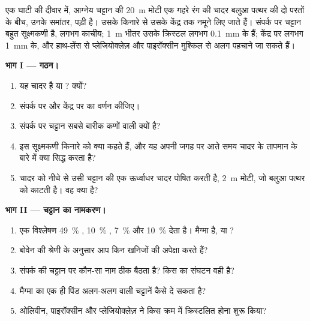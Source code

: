 \begin{problem}
\label{pb:g11:igneous-rocks:1}
एक घाटी की दीवार में, आग्नेय चट्टान की \qty{20}{m} मोटी एक गहरे रंग की चादर
बलुआ पत्थर की दो परतों के बीच, उनके समांतर, पड़ी है। उसके किनारे से उसके
केंद्र तक नमूने लिए जाते हैं। संपर्क पर चट्टान बहुत सूक्ष्मकणी है, लगभग
काचीय; \qty{1}{m} भीतर उसके क्रिस्टल लगभग \qty{0.1}{mm} के हैं;
केंद्र पर लगभग \qty{1}{mm} के, और हाथ-लेंस से प्लेजियोक्लेज़ और पाइरॉक्सीन मुश्किल से
अलग पहचाने जा सकते हैं।

\medskip
\noindent\textbf{भाग I --- गठन।}
\begin{enumerate}
  \item यह चादर  है या ? क्यों?
  \item संपर्क पर और केंद्र पर  का वर्णन कीजिए।
  \item संपर्क पर चट्टान सबसे बारीक कणों वाली क्यों है?
  \item इस सूक्ष्मकणी किनारे को क्या कहते हैं, और यह अपनी जगह पर आते समय
        चादर के तापमान के बारे में क्या सिद्ध करता है?
  \item चादर को नीचे से उसी चट्टान की एक ऊर्ध्वाधर चादर पोषित करती है,
        \qty{2}{m} मोटी, जो बलुआ पत्थर को काटती है। वह क्या है?
\end{enumerate}

\medskip
\noindent\textbf{भाग II --- चट्टान का नामकरण।}
\begin{enumerate}[resume]
  \item एक विश्लेषण \qty{49}{\percent} , \qty{10}{\percent}
        , \qty{7}{\percent}  और \qty{10}{\percent}
         देता है। मैग्मा  है,  या ?
  \item बोवेन की श्रेणी के अनुसार आप किन खनिजों की अपेक्षा करते हैं?
  \item संपर्क की चट्टान पर कौन-सा नाम ठीक बैठता है? किस  का
        संघटन वही है?
  \item मैग्मा का एक ही पिंड अलग-अलग  वाली चट्टानें कैसे दे सकता है?
  \item ओलिवीन, पाइरॉक्सीन और प्लेजियोक्लेज़ ने किस क्रम में क्रिस्टलित होना
        शुरू किया?
\end{enumerate}


\end{problem}
